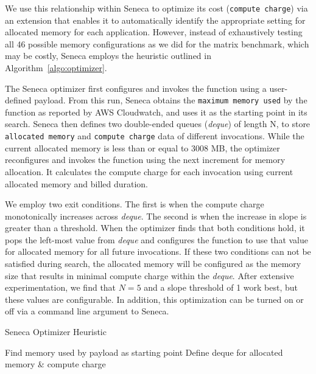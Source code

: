 We use this relationship within
Seneca to optimize its cost (\texttt{compute charge}) via an extension
that enables it to automatically identify the appropriate
setting for allocated memory for each application.
However, instead of exhaustively testing all 46 possible 
memory configurations as we did for the matrix benchmark, 
which may be costly,  Seneca employs the heuristic outlined in
Algorithm~\ref{algo:optimizer}. 

The Seneca optimizer first configures and invokes the function using a user-defined payload.  From this run, Seneca obtains the \texttt{maximum memory used}
by the function as reported by AWS Cloudwatch,
and uses it as the starting point in its search.
Seneca then defines two double-ended queues 
(\textit{deque}) of length N, to store 
\texttt{allocated memory} and \texttt{compute charge} data of different invocations. While the current 
allocated memory is less than or equal to 3008 MB, 
the optimizer reconfigures and invokes the function 
using the next increment for memory allocation.  It 
calculates the compute charge for each invocation 
using current allocated memory and billed duration. 

We employ two exit conditions. The first is when the  compute charge monotonically increases across \textit{deque}. The second is when the increase in slope is greater than a threshold. When the optimizer finds that both conditions hold, it pops the left-most value from \textit{deque} and configures the function to use that value for allocated memory for all future invocations. If these two conditions can not be satisfied during search, the allocated memory will be configured as the memory size that results in minimal compute charge within the \textit{deque}. After extensive experimentation, we find that $N=5$ and a slope threshold of 1 work best, but these values are configurable. In addition, this optimization can be turned on or off via a command line argument to Seneca.

\begin{algorithm}[]
\caption{Seneca Optimizer Heuristic}
\label{algo:optimizer}
\SetAlgoLined
{}
Find memory used by payload as starting point\;
Define deque for allocated memory \& compute charge\;
\end{algorithm}


